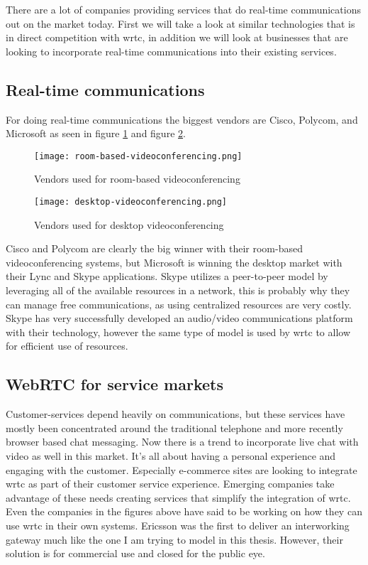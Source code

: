 There are a lot of companies providing services that do real-time communications out on the market today. First we will take a look at similar technologies\cite{lopez_fernandez_catalysing_2013} that is in direct competition with \gls{wrtc}, in addition we will look at businesses that are looking to incorporate real-time communications into their existing services.

\subsection{Real-time communications}
For doing real-time communications the biggest vendors are Cisco, Polycom, and Microsoft as seen in figure \ref{fig:room-based-videoconferencing} and figure \ref{fig:desktop-videoconferencing}.

\begin{figure}[here]
\centerline{\texttt{[image: room-based-videoconferencing.png]}}
\label{fig:room-based-videoconferencing}
\caption{Vendors used for room-based videoconferencing}
\end{figure}

\begin{figure}[here]
\centerline{\texttt{[image: desktop-videoconferencing.png]}}
\caption{Vendors used for desktop videoconferencing}
\label{fig:desktop-videoconferencing}
\end{figure}

Cisco and Polycom are clearly the big winner with their room-based videoconferencing systems, but Microsoft is winning the desktop market with their Lync and Skype applications. Skype utilizes a peer-to-peer model by leveraging all of the available resources in a network, this is probably why they can manage free communications, as using centralized resources are very costly. Skype has very successfully developed an audio/video communications platform with their technology, however the same type of model is used by \gls{wrtc} to allow for efficient use of resources.

\subsection{WebRTC for service markets}
Customer-services depend heavily on communications, but these services have mostly been concentrated around the traditional telephone and more recently browser based chat messaging. Now there is a trend to incorporate live chat with video as well in this market\cite{amazon_mayday}. It's all about having a personal experience and engaging with the customer. Especially e-commerce sites are looking to integrate \gls{wrtc} as part of their customer service experience. Emerging companies take advantage of these needs creating services that simplify the integration of \gls{wrtc}. Even the companies in the figures above have said to be working on how they can use \gls{wrtc} in their own systems\cite{polycom-webrtc}. Ericsson was the first to deliver an interworking gateway\cite{ericsson-gateway} much like the one I am trying to model in this thesis. However, their solution is for commercial use and closed for the public eye.

